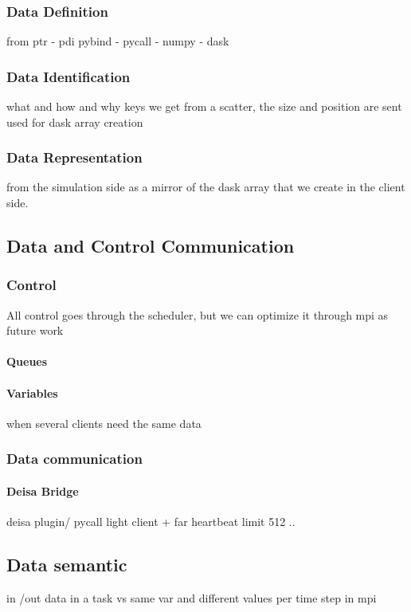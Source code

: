 \subsubsection{Data Definition}\label{sec:datamodel:datadef}
from ptr - pdi pybind -  pycall - numpy - dask

\subsubsection{Data Identification}\label{sec:datamodel:dataid}
what and how and why 
keys we get from a scatter, the size and position are sent 
used for dask array creation 
\subsubsection{Data Representation}\label{sec:datamodel:datarepresent}
from the simulation side as a mirror of the dask array that we create in the client side.

\subsection{Data and Control Communication}
\subsubsection{Control}
All control goes through the scheduler, but we can optimize it through mpi as future work 
\paragraph{Queues} 

\paragraph{Variables}
when several clients need the same data 

\subsubsection{Data communication}
\paragraph{Deisa Bridge}
deisa plugin/ pycall
light client + far heartbeat 
limit 512 ..

\subsection{Data semantic}
in /out  data in a task vs same var and different values per time step in mpi

